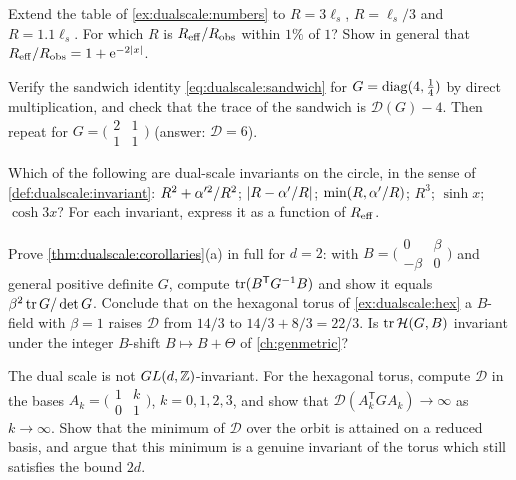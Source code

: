 \begin{exercise}[$\star$]
Extend the table of \cref{ex:dualscale:numbers} to $R=3\ell_s$, $R=\ell_s/3$ and
$R=1.1\ell_s$. For which $R$ is $R_{\rm eff}/R_{\rm obs}$ within $1\%$ of $1$? Show in general
that $R_{\rm eff}/R_{\rm obs}=1+\mathrm{e}^{-2|x|}$.
\end{exercise}

\begin{exercise}[$\star$]
Verify the sandwich identity \eqref{eq:dualscale:sandwich} for
$G=\operatorname{diag}(4,\tfrac14)$ by direct multiplication, and check that the trace of the sandwich is
$\mathcal D(G)-4$. Then repeat for $G=\big(\begin{smallmatrix}2&1\\1&1\end{smallmatrix}\big)$
(answer: $\mathcal D=6$).
\end{exercise}

\begin{exercise}[$\star$]
Which of the following are dual-scale invariants on the circle, in the sense of
\cref{def:dualscale:invariant}: $R^2+\alpha'^2/R^2$; $|R-\alpha'/R|$; $\min(R,\alpha'/R)$; $R^3$;
$\sinh x$; $\cosh3x$? For each invariant, express it as a function of $R_{\rm eff}$.
\end{exercise}

\begin{exercise}[$\star\star$]
Prove \cref{thm:dualscale:corollaries}(a) in full for $d=2$: with
$B=\big(\begin{smallmatrix}0&\beta\\-\beta&0\end{smallmatrix}\big)$ and general positive
definite $G$, compute $\operatorname{tr}(B^{\mathsf T}G^{-1}B)$ and show it equals $\beta^2\operatorname{tr} G/\det G$.
Conclude that on the hexagonal torus of \cref{ex:dualscale:hex} a $B$-field with $\beta=1$
raises $\mathcal D$ from $14/3$ to $14/3+8/3=22/3$. Is $\operatorname{tr}\mathcal{H}(G,B)$ invariant under the
integer $B$-shift $B\mapsto B+\Theta$ of \cref{ch:genmetric}?
\end{exercise}

\begin{exercise}[$\star\star$]
The dual scale is not $GL(d,\mathbb{Z})$-invariant. For the hexagonal torus, compute $\mathcal D$ in
the bases $A_k=\big(\begin{smallmatrix}1&k\\0&1\end{smallmatrix}\big)$, $k=0,1,2,3$, and show
that $\mathcal D(A_k^{\mathsf T}GA_k)\to\infty$ as $k\to\infty$. Show that the minimum of
$\mathcal D$ over the orbit is attained on a reduced basis, and argue that this minimum is a
genuine invariant of the torus which still satisfies the bound $2d$.
\end{exercise}

